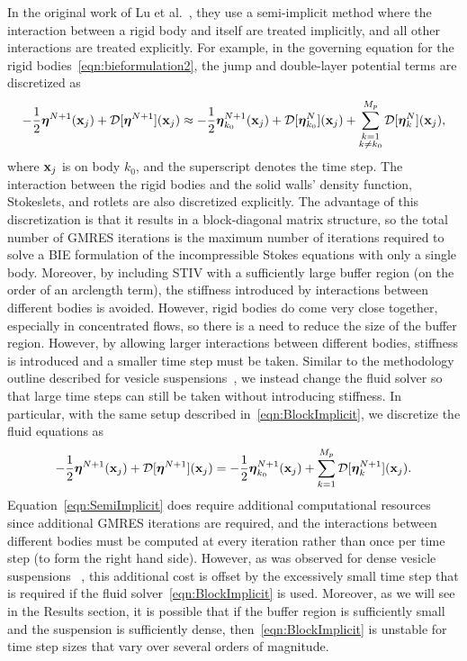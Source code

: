 \documentclass[preprint, 10pt]{elsarticle}
\begin{document}
In the original work of Lu et al.~\cite{Lu2017}, they use a
semi-implicit method where the interaction between a rigid body and
itself are treated implicitly, and all other interactions are treated
explicitly.  For example, in the governing equation for the rigid
bodies~\eqref{eqn:bieformulation2}, the jump and double-layer potential
terms are discretized as
\begin{align}
  -\frac{1}{2}{\boldsymbol\eta}^{N+1}({\mathbf{x}}_j) + {\mathcal{D}}[{\boldsymbol\eta}^{N+1}]({\mathbf{x}}_j) \approx
  -\frac{1}{2}{\boldsymbol\eta}^{N+1}_{k_0}({\mathbf{x}}_j) + 
  {\mathcal{D}}[{\boldsymbol\eta}^{N}_{k_0}]({\mathbf{x}}_j) + 
  \sum_{\substack{k=1 \\ k \neq k_0}}^{M_p} {\mathcal{D}}[{\boldsymbol\eta}^{N}_k]({\mathbf{x}}_j),
  \label{eqn:BlockImplicit}
\end{align}
where ${\mathbf{x}}_j$ is on body $k_0$, and the superscript denotes the time
step.  The interaction between the rigid bodies and the solid walls'
density function, Stokeslets, and rotlets are also discretized
explicitly.  The advantage of this discretization is that it results in
a block-diagonal matrix structure, so the total number of GMRES
iterations is the maximum number of iterations required to solve a BIE
formulation of the incompressible Stokes equations with only a single
body.  Moreover, by including STIV with a sufficiently large buffer
region (on the order of an arclength term), the stiffness introduced by
interactions between different bodies is avoided.  However, rigid bodies
do come very close together, especially in concentrated flows, so there
is a need to reduce the size of the buffer region.  However, by allowing
larger interactions between different bodies, stiffness is introduced
and a smaller time step must be taken.  Similar to the methodology
outline described for vesicle suspensions~\cite{Quaife2014}, we instead
change the fluid solver so that large time steps can still be taken
without introducing stiffness.  In particular, with the same setup
described in~\eqref{eqn:BlockImplicit}, we discretize the fluid
equations as
\begin{align}
  -\frac{1}{2}{\boldsymbol\eta}^{N+1}({\mathbf{x}}_j) + {\mathcal{D}}[{\boldsymbol\eta}^{N+1}]({\mathbf{x}}_j) =
  -\frac{1}{2}{\boldsymbol\eta}^{N+1}_{k_0}({\mathbf{x}}_j) + 
  \sum_{k=1}^{M_p} {\mathcal{D}}[{\boldsymbol\eta}^{N+1}_k]({\mathbf{x}}_j).
  \label{eqn:SemiImplicit}
\end{align}
Equation~\eqref{eqn:SemiImplicit} does require additional computational
resources since additional GMRES iterations are required, and the
interactions between different bodies must be computed at every
iteration rather than once per time step (to form the right hand side).
However, as was observed for dense vesicle suspensions~\cite{Quaife2014}
, this additional cost is offset by the
excessively small time step that is required if the fluid
solver~\eqref{eqn:BlockImplicit} is used.  Moreover, as we will see in
the Results section, it is possible that if the buffer region is
sufficiently small and the suspension is sufficiently dense,
then~\eqref{eqn:BlockImplicit} is unstable for time step sizes that vary
over several orders of magnitude.
\end{document}
